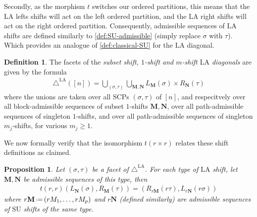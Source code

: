 \documentclass{amsart}
\newcommand{\darkblue}{\color{darkblue}} %
\newtheorem{proposition}[theorem]{Proposition}
\theoremstyle{definition}
\newtheorem{definition}[theorem]{Definition}
\renewcommand{\b}[1]{{\boldsymbol{#1}}} %
\newcommand{\eqdef}{\mbox{\,\raisebox{0.2ex}{\scriptsize\ensuremath{\mathrm:}}\ensuremath{=}\,}} %
\newcommand{\defn}[1]{\textsl{\darkblue #1}} %
\renewcommand{\b}[1]{\boldsymbol{#1}} %
\newcommand{\SU}{\mathrm{SU}}
\newcommand{\LA}{\mathrm{LA}}
\newcommand{\LAD}{\triangle^{\mathrm{LA}}}
\newcommand{\SCP}{\mathrm{SCP}}
\begin{document}
Secondly, as the morphism $t$ switches our ordered partitions, this means that the $\LA$ lefts shifts will act on the left ordered partition, and the $\LA$ right shifts will act on the right ordered partition.
Consequently, admissible sequences of $\LA$ shifts are defined similarly to \cref{def:SU-admissible} (simply replace $\sigma$ with $\tau$).
Which provides an analogue of \cref{def:classical-SU} for the $\LA$ diagonal. 

\begin{definition}
\label{def:classical-LA}
The facets of the \defn{subset shift, $1$-shift and $m$-shift $\LA$ diagonals} are given by the formula
\begin{align*}
\LAD([n]) = \bigcup_{(\sigma,\tau)} \bigcup_{\mathbf{M}, \mathbf{N}} L_\mathbf{M}(\sigma)\times R_\mathbf{N}(\tau)
\end{align*}
where the unions are taken over all $\SCP$s $(\sigma, \tau)$ of $[n]$, and respecitvely over all block-admissible sequences of subset $1$-shifts $\b{M},\b{N}$, over all path-admissible sequences of singleton $1$-shifts, and over all path-admissible sequences of singleton $m_j$-shifts, for various $m_j \ge 1$.
\end{definition}

We now formally verify that the isomorphism $t(r\times r)$ relates these shift definitions as claimed.

\begin{proposition} 
\label{prop:trr is an isomorphism of shifts}
Let $(\sigma,\tau)$ be a facet of $\LAD$.
For each type of $\LA$ shift, let $\b{M},\b{N}$ be admissible sequences of this type, then 
\begin{align*}
t(r,r)(L_\mathbf{N}(\sigma), R_\mathbf{M}(\tau)) = (R_{r\mathbf{M}}(r\tau), L_{r\mathbf{N}}(r\sigma))
\end{align*}
where $r\mathbf{M} \eqdef (rM_{1},\dots,rM_{p})$ and $r\mathbf{N}$ (defined similarly) are admissible sequences of $\SU$ shifts of the same type.
\end{proposition}
\end{document}
